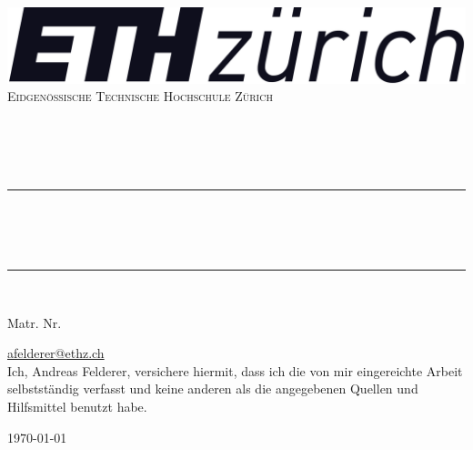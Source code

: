 \begin{titlepage}
	\centering
    \vspace*{0.4 cm}
    \includegraphics[scale = 0.15]{figures/ETHZ_logo_black.png}\\[1.0 cm]	%
    \textsc{\LARGE Eidgenössische Technische Hochschule Zürich}\\[2.0 cm]
	
	\textsc{\Large \docLectureNumber}\\[0.5 cm]	%
	\textsc{\Large \bfseries\sffamily \docLectureTitle}\\[0.5 cm]	%
	{\large \docTeacher}\\[0.5cm]
	\textsc{\large \docTerm }\\[0.5 cm]
	\rule{\linewidth}{0.2 mm} \\[0.6 cm]

	{\huge\bfseries\sffamily \docTitle}\\[0.5 cm]
	{\Large\sffamily \docSubTitle}\\
	\rule{\linewidth}{0.2 mm} \\[0.4 cm]
	
	{\Large\itshape \docAuthor \par}
	Matr. Nr. \docMatNr \par
	\href{mailto:afelderer@ethz.ch}{afelderer@ethz.ch} \\[2 cm]

	
	Ich, Andreas Felderer, versichere hiermit, dass ich die von mir eingereichte Arbeit selbstständig verfasst und keine
anderen als die angegebenen Quellen und Hilfsmittel benutzt habe.

	\vfill


	{\large \today \par}
\end{titlepage}